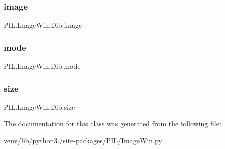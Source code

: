 \subsubsection{\texorpdfstring{image}{image}}
{\footnotesize\ttfamily P\+I\+L.\+Image\+Win.\+Dib.\+image}

\mbox{\label{classPIL_1_1ImageWin_1_1Dib_ab1ae9942bb716440c85aa52d62f7b03a}} 
\subsubsection{\texorpdfstring{mode}{mode}}
{\footnotesize\ttfamily P\+I\+L.\+Image\+Win.\+Dib.\+mode}

\mbox{\label{classPIL_1_1ImageWin_1_1Dib_ae6273cf68a43e12f710dd26d7a2b9837}} 
\subsubsection{\texorpdfstring{size}{size}}
{\footnotesize\ttfamily P\+I\+L.\+Image\+Win.\+Dib.\+size}



The documentation for this class was generated from the following file\+:\begin{DoxyCompactItemize}
\item 
venv/lib/python3./site-\/packages/\+P\+I\+L/\hyperlink{ImageWin_8py}{Image\+Win.\+py}\end{DoxyCompactItemize}
